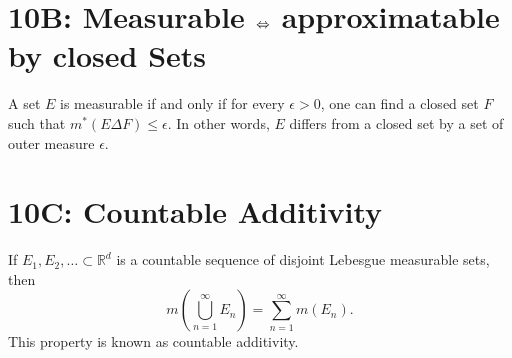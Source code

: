 \documentclass[lang=cn,11pt]{template}
\begin{document}
\section*{10B: Measurable $\Leftrightarrow$ approximatable by closed Sets}
A set \( E \) is measurable if and only if for every \( \epsilon > 0 \), one can find a closed set \( F \) such that \( m^*(E \Delta F) \leq \epsilon \). In other words, \( E \) differs from a closed set by a set of outer measure \( \epsilon \).

\section*{10C: Countable Additivity}
\begin{theorem}
If \( E_1, E_2, \dots \subset \mathbb{R}^d \) is a countable sequence of disjoint Lebesgue measurable sets, then
\[
m\left( \bigcup_{n=1}^{\infty} E_n \right) = \sum_{n=1}^{\infty} m(E_n).
\]
This property is known as countable additivity.
\end{theorem}


\end{document}

